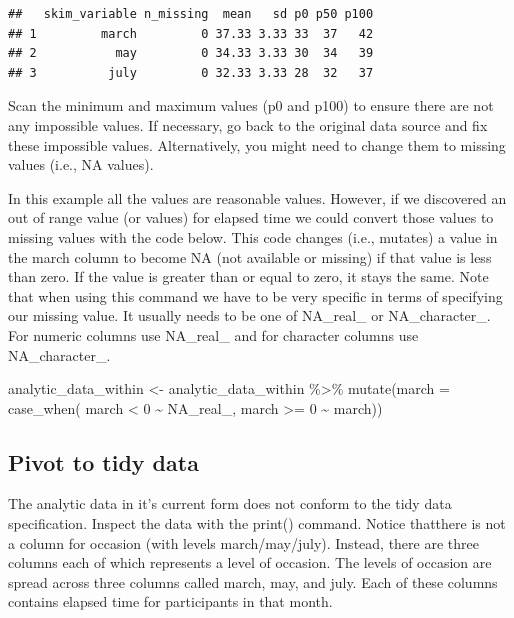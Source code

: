 \documentclass[
]{krantz}
\makeatletter
\newenvironment{Shaded}{\begin{snugshade}}{\end{snugshade}}
\newcommand{\AttributeTok}[1]{\textcolor[rgb]{0.61,0.61,0.61}{#1}}
\newcommand{\ConstantTok}[1]{\textcolor[rgb]{0,0,0}{#1}}
\newcommand{\DecValTok}[1]{\textcolor[rgb]{0.06,0.06,0.06}{#1}}
\newcommand{\FunctionTok}[1]{\textcolor[rgb]{0,0,0}{#1}}
\newcommand{\NormalTok}[1]{#1}
\newcommand{\OtherTok}[1]{\textcolor[rgb]{0.37,0.37,0.37}{#1}}
\newcommand{\SpecialCharTok}[1]{\textcolor[rgb]{0,0,0}{#1}}
\newenvironment{kframe}{%
\medskip{}
\setlength{\fboxsep}{.8em}
 \def\at@end@of@kframe{}%
 \ifinner\ifhmode%
  \def\at@end@of@kframe{\end{minipage}}%
  \begin{minipage}{\columnwidth}%
 \fi\fi%
 \def\FrameCommand##1{\hskip\@totalleftmargin \hskip-\fboxsep
 \colorbox{shadecolor}{##1}\hskip-\fboxsep
     \hskip-\linewidth \hskip-\@totalleftmargin \hskip\columnwidth}%
 \MakeFramed {\advance\hsize-\width
   \@totalleftmargin\z@ \linewidth\hsize
   \@setminipage}}%
 {\par\unskip\endMakeFramed%
 \at@end@of@kframe}
\renewenvironment{Shaded}{\begin{kframe}}{\end{kframe}}
\makeatother
\begin{document}
\begin{verbatim}
##   skim_variable n_missing  mean   sd p0 p50 p100
## 1         march         0 37.33 3.33 33  37   42
## 2           may         0 34.33 3.33 30  34   39
## 3          july         0 32.33 3.33 28  32   37
\end{verbatim}

Scan the minimum and maximum values (p0 and p100) to ensure there are not any impossible values. If necessary, go back to the original data source and fix these impossible values. Alternatively, you might need to change them to missing values (i.e., NA values).

In this example all the values are reasonable values. However, if we discovered an out of range value (or values) for elapsed time we could convert those values to missing values with the code below. This code changes (i.e., mutates) a value in the march column to become NA (not available or missing) if that value is less than zero. If the value is greater than or equal to zero, it stays the same. Note that when using this command we have to be very specific in terms of specifying our missing value. It usually needs to be one of NA\_real\_ or NA\_character\_. For numeric columns use NA\_real\_ and for character columns use NA\_character\_.

\begin{Shaded}
\begin{Highlighting}[]
\NormalTok{analytic\_data\_within }\OtherTok{\textless{}{-}}\NormalTok{ analytic\_data\_within  }\SpecialCharTok{\%\textgreater{}\%} 
    \FunctionTok{mutate}\NormalTok{(}\AttributeTok{march =} \FunctionTok{case\_when}\NormalTok{(}
\NormalTok{      march }\SpecialCharTok{\textless{}} \DecValTok{0} \SpecialCharTok{\textasciitilde{}} \ConstantTok{NA\_real\_}\NormalTok{,}
\NormalTok{      march }\SpecialCharTok{\textgreater{}=} \DecValTok{0} \SpecialCharTok{\textasciitilde{}}\NormalTok{ march))}
\end{Highlighting}
\end{Shaded}

\hypertarget{pivot-to-tidy-data}{%
\subsection{Pivot to tidy data}\label{pivot-to-tidy-data}}

The analytic data in it's current form does not conform to the tidy data specification. Inspect the data with the print() command. Notice thatthere is not a column for occasion (with levels march/may/july). Instead, there are three columns each of which represents a level of occasion. The levels of occasion are spread across three columns called march, may, and july. Each of these columns contains elapsed time for participants in that month.
\end{document}
